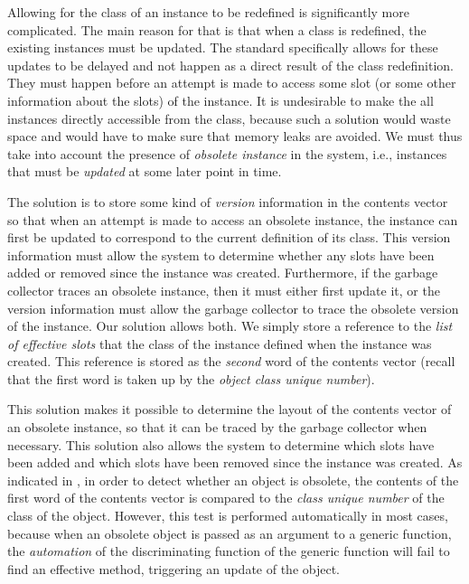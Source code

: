 Allowing for the class of an instance to be redefined is significantly
more complicated.  The main reason for that is that when a class is
redefined, the existing instances must be updated.  The standard
specifically allows for these updates to be delayed and not happen as
a direct result of the class redefinition.  They must happen before an
attempt is made to access some slot (or some other information about
the slots) of the instance.  It is undesirable to make the all
instances directly accessible from the class, because such a solution
would waste space and would have to make sure that memory leaks are
avoided.  We must thus take into account the presence of
\emph{obsolete instance} in the system, i.e., instances that must be
\emph{updated} at some later point in time. 

The solution is to store some kind of \emph{version} information in
the contents vector so that when an attempt is made to access an
obsolete instance, the instance can first be updated to correspond to
the current definition of its class.  This version information must
allow the system to determine whether any slots have been added or
removed since the instance was created.  Furthermore, if the garbage
collector traces an obsolete instance, then it must either first
update it, or the version information must allow the garbage collector
to trace the obsolete version of the instance.  Our solution allows
both.  We simply store a reference to the \emph{list of effective
  slots} that the class of the instance defined when the instance was
created.  This reference is stored as the \emph{second} word of the
contents vector (recall that the first word is taken up by the
\emph{object class unique
  number}).  

This solution makes it possible to determine the layout of the
contents vector of an obsolete instance, so that it can be traced by
the garbage collector when necessary.  This solution also allows the
system to determine which slots have been added and which slots have
been removed since the instance was created.  As indicated in
, in order to
detect whether an object is obsolete, the contents of the first word
of the contents vector is compared to the \emph{class unique number}
of the class of the object.  However, this test is performed
automatically in most cases, because when an obsolete object is passed
as an argument to a generic function, the \emph{automation} of the
discriminating function of the generic function will fail to find an
effective method, triggering an update of the object. 

